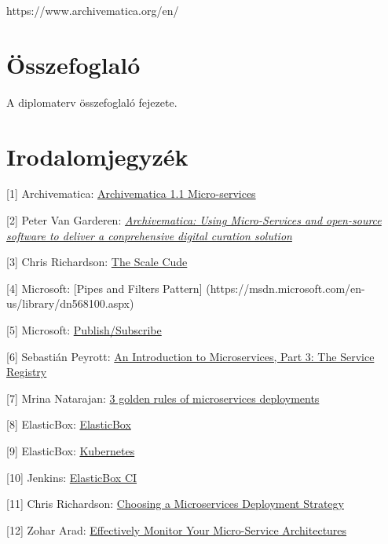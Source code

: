 \documentclass[11pt,magyar,a4paper,oneside,]{report}
\begin{document}
https://www.archivematica.org/en/

\chapter{Összefoglaló}\label{uxf6sszefoglaluxf3}

A diplomaterv összefoglaló fejezete.

\chapter*{Irodalomjegyzék}\label{irodalomjegyzuxe9k}

{[}1{]} Archivematica:
\href{https://wiki.archivematica.org/Archivematica_1.1_Micro-services}{Archivematica
1.1 Micro-services}

{[}2{]} Peter Van Garderen:
\href{http://citeseerx.ist.psu.edu/viewdoc/download?doi=10.1.1.384.7168\&rep=rep1\&type=pdf\#page=145}{\emph{Archivematica:
Using Micro-Services and open-source software to deliver a conprehensive
digital curation solution}}

{[}3{]} Chris Richardson:
\href{http://microservices.io/articles/scalecube.html}{The Scale Cude}

{[}4{]} Microsoft: {[}Pipes and Filters Pattern{]}
(https://msdn.microsoft.com/en-us/library/dn568100.aspx)

{[}5{]} Microsoft:
\href{https://msdn.microsoft.com/en-us/library/ff649664.aspx}{Publish/Subscribe}

{[}6{]} Sebastián Peyrott:
\href{https://auth0.com/blog/2015/10/02/an-introduction-to-microservices-part-3-the-service-registry/}{An
Introduction to Microservices, Part 3: The Service Registry}

{[}7{]} Mrina Natarajan:
\href{http://devops.com/2015/05/07/3-golden-rules-microservices-deployments/}{3
golden rules of microservices deployments}

{[}8{]} ElasticBox:
\href{https://elasticbox.com/how-it-works}{ElasticBox}

{[}9{]} ElasticBox: \href{https://elasticbox.com/kubernetes}{Kubernetes}

{[}10{]} Jenkins:
\href{https://wiki.jenkins-ci.org/display/JENKINS/ElasticBox+CI}{ElasticBox
CI}

{[}11{]} Chris Richardson:
\href{https://www.nginx.com/blog/deploying-microservices/}{Choosing a
Microservices Deployment Strategy}

{[}12{]} Zohar Arad:
\href{http://zohararad.github.io/presentations/micro-services-monitoring/}{Effectively
Monitor Your Micro-Service Architectures}
\end{document}
